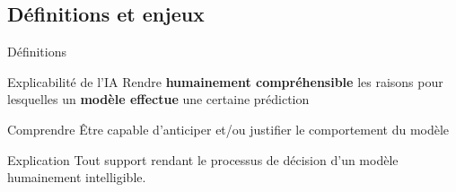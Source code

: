 \documentclass[french, 12pt, aspectratio=2013]{beamer}
\newcommand{\com}[1]{\textcolor{olive}{#1}}
\begin{document}
    \subsection{Définitions et enjeux}
        \begin{frame}{Définitions}
            \begin{block}{Explicabilité de l'IA}
                Rendre \textbf<2>{humainement compréhensible} les raisons pour lesquelles un \textbf<3>{modèle effectue} une certaine prédiction \cite{garouani_investigating_2024, bell_its_2022}
            \end{block}
            \pause[4]
            \begin{block}{Comprendre}
                Être capable d'anticiper et/ou justifier le comportement du modèle \cite{bell_its_2022}
            \end{block}
            \pause[5]
            \begin{block}{Explication}
                Tout support rendant le processus de décision d'un modèle humainement intelligible.
            \end{block}
        \end{frame}
        
\end{document}
